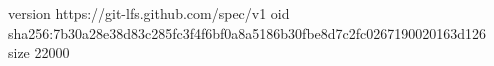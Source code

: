 version https://git-lfs.github.com/spec/v1
oid sha256:7b30a28e38d83c285fc3f4f6bf0a8a5186b30fbe8d7c2fc0267190020163d126
size 22000
